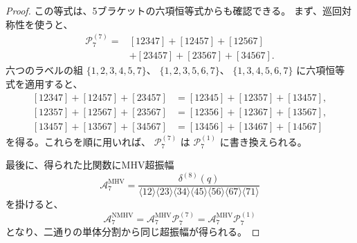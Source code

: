 \documentclass[uplatex,dvipdfmx,a4paper,11pt]{jsarticle}
\renewcommand{\proofname}{Proof}
\newenvironment{myproof}[1][\proofname]
  {\begin{proof}[#1]}
  {\end{proof}}
\numberwithin{equation}{section}
\begin{document}
\begin{myproof}
  この等式は、5ブラケットの六項恒等式からも確認できる。
  まず、巡回対称性を使うと、
  \[
    \begin{aligned}
      \mathcal P_7^{(7)}
      ={}&
        [12347]+[12457]+[12567]\\
        &+[23457]+[23567]+[34567].
    \end{aligned}
  \]
  六つのラベルの組
  $\{1,2,3,4,5,7\}$、
  $\{1,2,3,5,6,7\}$、
  $\{1,3,4,5,6,7\}$
  に六項恒等式を適用すると、
  \[
    \begin{aligned}
      [12347]+[12457]+[23457]
      &=[12345]+[12357]+[13457],\\
      [12357]+[12567]+[23567]
      &=[12356]+[12367]+[13567],\\
      [13457]+[13567]+[34567]
      &=[13456]+[13467]+[14567]
    \end{aligned}
  \]
  を得る。これらを順に用いれば、
  $\mathcal P_7^{(7)}$ は
  $\mathcal P_7^{(1)}$ に書き換えられる。

  最後に、得られた比関数にMHV超振幅
  \[
    \mathcal A_7^{\mathrm{MHV}}
      =
      \frac{\delta^{(8)}(q)}{
        \langle12\rangle\langle23\rangle
        \langle34\rangle\langle45\rangle
        \langle56\rangle\langle67\rangle
        \langle71\rangle
      }
  \]
  を掛けると、
  \[
    \mathcal A_7^{\mathrm{NMHV}}
      =
      \mathcal A_7^{\mathrm{MHV}}\mathcal P_7^{(7)}
      =
      \mathcal A_7^{\mathrm{MHV}}\mathcal P_7^{(1)}
  \]
  となり、二通りの単体分割から同じ超振幅が得られる。
\end{myproof}
\end{document}
